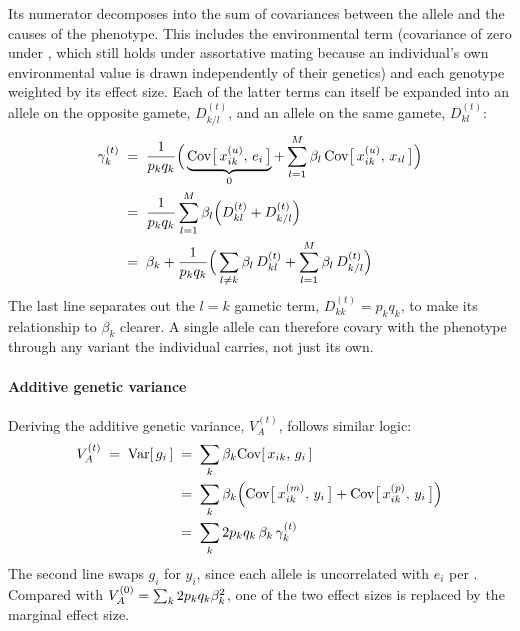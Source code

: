 \documentclass[12pt]{article}
\numberwithin{equation}{section}
\begin{document}
Its numerator decomposes into the sum of covariances between the allele and the causes of the phenotype.
This includes the environmental term (covariance of zero under , which still holds under assortative mating because an individual's own environmental value is drawn independently of their genetics) and each genotype weighted by its effect size.
Each of the latter terms can itself be expanded into an allele on the opposite gamete, $D^{(t)}_{k/l}$, and an allele on the same gamete, $D^{(t)}_{kl}$:
\begin{equation}\label{eq:gamma-from-D}
\begin{aligned}
    \gamma^{(t)}_k
    \;&=\; \frac{1}{p_k q_k}\Big(\underbrace{\mathrm{Cov}\big[\,x^{(u)}_{ik},\, e_i\,\big]}_{0} + \sum_{l=1}^{M} \beta_l\,\mathrm{Cov}\big[\,x^{(u)}_{ik},\, x_{il}\,\big]\Big) \\
    \;&=\; \frac{1}{p_k q_k} \sum_{l=1}^{M} \beta_l \Big(D^{(t)}_{kl} + D^{(t)}_{k/l}\Big) \\
    \;&=\; \beta_k + \frac{1}{p_k q_k}\Big(\sum_{l \neq k} \beta_l\, D^{(t)}_{kl} + \sum_{l=1}^{M} \beta_l\, D^{(t)}_{k/l}\Big)
\end{aligned}
\end{equation}
The last line separates out the $l = k$ gametic term, $D^{(t)}_{kk} = p_k q_k$, to make its relationship to $\beta_k$ clearer.
A single allele can therefore covary with the phenotype through any variant the individual carries, not just its own.

\paragraph{Additive genetic variance}
Deriving the additive genetic variance, $V_A^{(t)}$, follows similar logic:
\begin{equation}\label{eq:VA-from-gamma}
\begin{aligned}
    V_A^{(t)} \;=\; \mathrm{Var}[\,g_i\,]
    \;&=\; \sum_{k} \beta_k \mathrm{Cov}[\,x_{ik},\, g_i\,] \\
    \;&=\; \sum_{k} \beta_k \Big(\mathrm{Cov}\big[\,x^{(m)}_{ik},\, y_i\,\big] + \mathrm{Cov}\big[\,x^{(p)}_{ik},\, y_i\,\big]\Big) \\
    \;&=\; \sum_{k} 2 p_k q_k\, \beta_k\, \gamma^{(t)}_k
\end{aligned}
\end{equation}
The second line swaps $g_i$ for $y_i$, since each allele is uncorrelated with $e_i$ per .
Compared with $V_A^{(0)} = \sum_k 2 p_k q_k \beta_k^2$, one of the two effect sizes is replaced by the marginal effect size.
\end{document}
